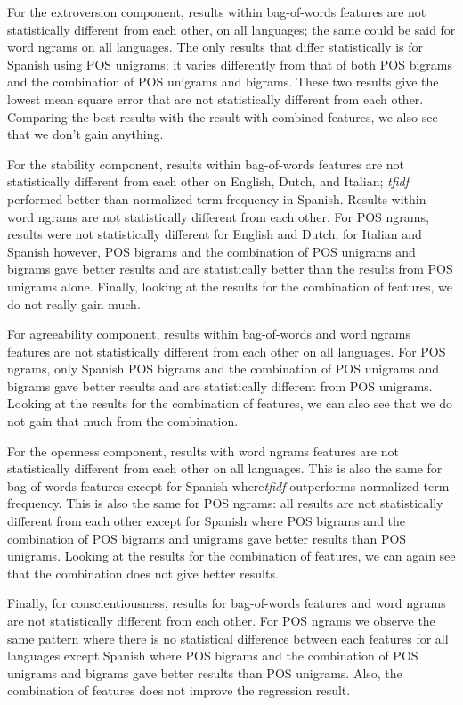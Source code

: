 \documentclass[a4paper]{llncs}
\begin{document}
For the extroversion component, results within bag-of-words features are not statistically different from each other, on all languages; the same could be said for word ngrams on all languages. The only results that differ statistically is for Spanish using POS unigrams; it varies differently from that of both POS bigrams and the combination of POS unigrams and bigrams. These two results give the lowest mean square error that are not statistically different from each other. Comparing the best results with the result with combined features, we also see that we don't gain anything. 

For the stability component, results within bag-of-words features are not statistically different from each other on English, Dutch, and Italian; \textit{tfidf} performed better than normalized term frequency in Spanish. Results within word ngrams are not statistically different from each other. For POS ngrams, results were not statistically different for English and Dutch; for Italian and Spanish however, POS bigrams and the combination of POS unigrams and bigrams gave better results and are statistically better than the results from POS unigrams alone. Finally, looking at the results for the combination of features, we do not really gain much. 

For agreeability component, results within bag-of-words and word ngrams features are not statistically different from each other on all languages. For POS ngrams, only Spanish POS bigrams and the combination of POS unigrams and bigrams gave better results and are statistically different from POS unigrams. Looking at the results for the combination of features, we can also see that we do not gain that much from the combination.

For the openness component, results with word ngrams features are not statistically different from each other on all languages. This is also the same for bag-of-words features except for Spanish where\textit{tfidf} outperforms normalized term frequency. This is also the same for POS ngrams: all results are not statistically different from each other except for Spanish where POS bigrams and the combination of POS bigrams and unigrams gave better results than POS unigrams. Looking at the results for the combination of features, we can again see that the combination does not give better results. 

Finally, for conscientiousness, results for bag-of-words features and word ngrams are not statistically different from each other. For POS ngrams we observe the same pattern where there is no statistical difference between each features for all languages except Spanish where POS bigrams and the combination of POS unigrams and bigrams gave better results than POS unigrams. Also, the combination of features does not improve the regression result.
\end{document}
